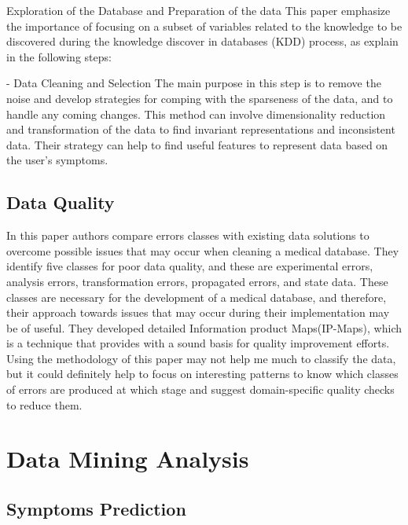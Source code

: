\documentclass{sig-alternate}
\begin{document}
Exploration of the Database and Preparation of the data\newline 
This paper emphasize the importance of focusing on a subset of variables related to the knowledge to be discovered during the knowledge discover in databases (KDD) process, as explain in the following steps:\newline

- Data Cleaning and Selection\newline
The main purpose in this step is to remove the noise and develop strategies for comping with the sparseness of the data, and to handle any coming changes. This method can involve dimensionality reduction and transformation of the data to find invariant representations and inconsistent data. Their strategy can help to find useful features to represent data based on the user's symptoms.\newline 
	
	\subsection{Data Quality}
	\label{Data Quality}
	In this paper authors compare errors classes with existing data solutions to overcome possible issues that may occur when cleaning a medical database. They identify five classes for poor data quality, and these are experimental errors, analysis errors, transformation errors, propagated errors, and state data. These classes are necessary for the development of a medical database, and therefore, their approach towards issues that may occur during their implementation may be of useful. They developed detailed Information product Maps(IP-Maps), which is a technique that provides with a sound basis for quality improvement efforts. Using the methodology of this paper may not help me much to classify the data, but it could definitely help to focus on interesting patterns to know which classes of errors are produced at which stage and suggest domain-specific quality checks to reduce them.
	
	
\section{Data Mining Analysis}
\label{Data Mining Analysis}

	\subsection{Symptoms Prediction}
	\label{Symptoms Prediction}
	
\end{document}
